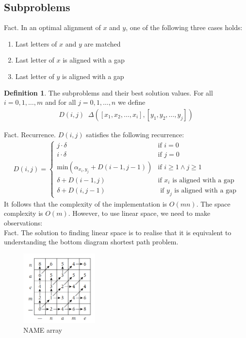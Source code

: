 \documentclass[a4paper]{article}
\theoremstyle{plain}
\newcommand*{\MyDef}{\mathrm{def}}
\newcommand*{\eqdef}{\ensuremath{\mathop{\overset{\MyDef}{=}}}}
\theoremstyle{definition}
\newtheorem{defn}{Definition}[section]
\theoremstyle{remark}
\begin{document}
		\subsection{Subproblems}
		Fact. In an optimal alignment of $x$ and $y$, one of the following three cases holds:
		\begin{enumerate}
			\item Last letters of $x$ and $y$ are matched
			\item Last letter of $x$ is aligned with a gap
			\item Last letter of $y$ is aligned with a gap
		\end{enumerate}
		\begin{defn}
			The subproblems and their best solution values. For all $i=0,1,\ldots,m$ and for all $j=0,1,\ldots,n$ we define
			\begin{align*}
				D(i,j) \eqdef \Delta([x_1,x_2,\ldots,x_i],[y_1,y_2,\ldots,y_j])
			\end{align*}
		\end{defn}
		Fact. Recurrence. $D(i,j)$ satisfies the following recurrence:
		\begin{align*}
			D(i,j) = \begin{cases}
				j \cdot \delta& \text{if }i=0 \\
				i \cdot \delta & \text{if }j=0 \\
				\text{min}\left( \alpha_{x_i,y_j}+D(i-1,j-1) \right) &\text{if }i \ge 1 \land j\ge 1 \\
				\delta + D(i-1,j) & \text{if $x_i$ is aligned with a gap} \\
				\delta + D(i,j-1) & \text{ if $y_j$ is aligned with a gap}
			\end{cases}
	\end{align*}
	It follows that the complexity of the implementation is $O(mn)$. The space complexity is $O(m)$. However, to use linear space, we need to make observations: \\
	Fact. The solution to finding linear space is to realise that it is equivalent to understanding the bottom diagram shortest path problem.
	\begin{figure}[H]
		\centering
		\includegraphics[width=0.35\textwidth]{diagram.png}
		\caption{NAME array}
		\label{fig:diagram-png}
	\end{figure}
\end{document}
